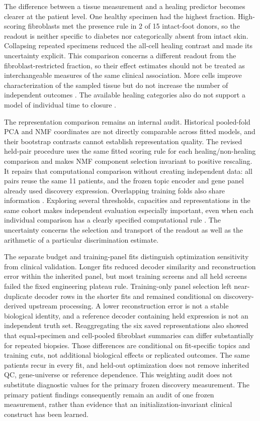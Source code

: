 \documentclass[10pt,a4paper]{article}
\begin{document}
The difference between a tissue measurement and a healing predictor becomes clearer at the patient level. One healthy specimen had the highest fraction. High-scoring fibroblasts met the presence rule in 2 of 15 intact-foot donors, so the readout is neither specific to diabetes nor categorically absent from intact skin. Collapsing repeated specimens reduced the all-cell healing contrast and made its uncertainty explicit. This comparison concerns a different readout from the fibroblast-restricted fraction, so their effect estimates should not be treated as interchangeable measures of the same clinical association. More cells improve characterization of the sampled tissue but do not increase the number of independent outcomes \citep{squair2021,zimmerman2021}. The available healing categories also do not support a model of individual time to closure \citep{armstrong2017}.

The representation comparison remains an internal audit. Historical pooled-fold PCA and NMF coordinates are not directly comparable across fitted models, and their bootstrap contrasts cannot establish representation quality. The revised held-pair procedure uses the same fitted scoring rule for each healing/non-healing comparison and makes NMF component selection invariant to positive rescaling. It repairs that computational comparison without creating independent data: all pairs reuse the same 11 patients, and the frozen topic encoder and gene panel already used discovery expression. Overlapping training folds also share information \citep{bengio2004}. Exploring several thresholds, capacities and representations in the same cohort makes independent evaluation especially important, even when each individual comparison has a clearly specified computational rule \citep{cawley2010}. The uncertainty concerns the selection and transport of the readout as well as the arithmetic of a particular discrimination estimate.

The separate budget and training-panel fits distinguish optimization sensitivity from clinical validation. Longer fits reduced decoder similarity and reconstruction error within the inherited panel, but most training screens and all held screens failed the fixed engineering plateau rule. Training-only panel selection left near-duplicate decoder rows in the shorter fits and remained conditional on discovery-derived upstream processing. A lower reconstruction error is not a stable biological identity, and a reference decoder containing held expression is not an independent truth set. Reaggregating the six saved representations also showed that equal-specimen and cell-pooled fibroblast summaries can differ substantially for repeated biopsies. Those differences are conditional on fit-specific topics and training cuts, not additional biological effects or replicated outcomes. The same patients recur in every fit, and held-out optimization does not remove inherited QC, gene-universe or reference dependence. This weighting audit does not substitute diagnostic values for the primary frozen discovery measurement. The primary patient findings consequently remain an audit of one frozen measurement, rather than evidence that an initialization-invariant clinical construct has been learned.
\end{document}
